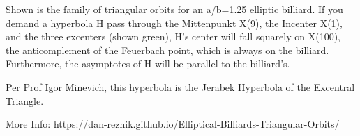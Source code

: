 Shown is the family of triangular orbits for an a/b=1.25 elliptic billiard. If you demand a hyperbola H pass through the Mittenpunkt X(9), the Incenter X(1), and the three excenters (shown green), H's center will fall squarely on X(100), the anticomplement of the Feuerbach point, which is always on the billiard. Furthermore, the asymptotes of H will be parallel to the billiard's.

Per Prof Igor Minevich, this hyperbola is the Jerabek Hyperbola of the Excentral Triangle.

More Info: https://dan-reznik.github.io/Elliptical-Billiards-Triangular-Orbits/